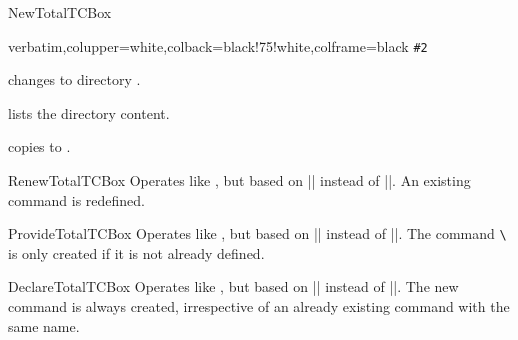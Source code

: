 \begin{docCommand}{NewTotalTCBox}{}
\begin{dispExample}
{verbatim,colupper=white,colback=black!75!white,colframe=black}
{%
  \lstinline[language=command.com,keywordstyle=\color{blue!35!white}\bfseries]^#2^}

 changes to directory .

 lists the directory content.

 copies  to
  .
\end{dispExample}
\end{docCommand}

\clearpage

\begin{docCommand}{RenewTotalTCBox}{}
  Operates like , but based on |\RenewDocumentCommand| instead of |\NewDocumentCommand|.
  An existing command is redefined.
\end{docCommand}

\begin{docCommand}{ProvideTotalTCBox}{}
  Operates like , but based on |\ProvideDocumentCommand| instead of |\NewDocumentCommand|.
  The command \texttt{\textbackslash} is only created if it is not already defined.
\end{docCommand}

\begin{docCommand}{DeclareTotalTCBox}{}
  Operates like , but based on |\NewDocumentCommand| instead of |\DeclareDocumentCommand|.
  The new command is always created, irrespective of an already existing
  command with the same name.
\end{docCommand}


